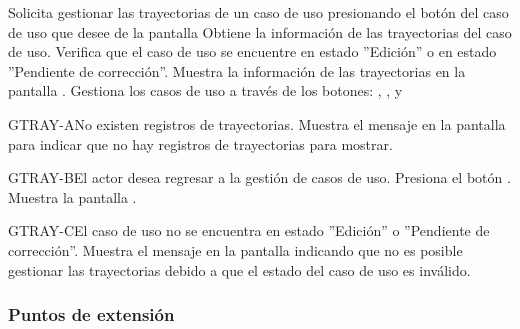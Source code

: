 \begin{UCtrayectoria}
	\UCpaso[\UCactor] Solicita gestionar las trayectorias de un caso de uso presionando el botón  del caso de uso que desee de la pantalla 
	\UCpaso[\UCsist] Obtiene la información de las trayectorias del caso de uso. 
	\UCpaso[\UCsist] Verifica que el caso de uso se encuentre en estado ''Edición'' o en estado ''Pendiente de corrección''.
	\UCpaso[\UCsist] Muestra la información de las trayectorias en la pantalla . 
	\UCpaso[\UCactor] Gestiona los casos de uso a través de los botones: , \editar, y \eliminar {} \label{CU12.1.1-P5}
\end{UCtrayectoria}		
\begin{UCtrayectoriaA}{GTRAY-A}{No existen registros de trayectorias.}
	\UCpaso[\UCsist] Muestra el mensaje  en la pantalla  para indicar que no hay registros de trayectorias para mostrar.
\end{UCtrayectoriaA}

\begin{UCtrayectoriaA}{GTRAY-B}{El actor desea regresar a la gestión de casos de uso.}
	\UCpaso[\UCactor] Presiona el botón .
	\UCpaso[\UCsist] Muestra la pantalla .
\end{UCtrayectoriaA}

\begin{UCtrayectoriaA}{GTRAY-C}{El caso de uso no se encuentra en estado ''Edición'' o ''Pendiente de corrección''.}
	\UCpaso[\UCsist] Muestra el mensaje  en la pantalla  indicando que no es posible gestionar las trayectorias debido a que el estado del caso de uso es inválido.
\end{UCtrayectoriaA}


\subsubsection{Puntos de extensión}


